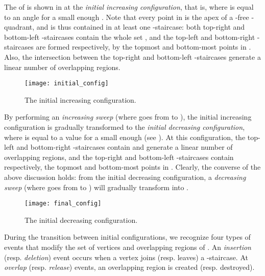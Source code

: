 \documentclass[11pt,letterpaper,english]{article}
\theoremstyle{definition}
\begin{document}
The  of  is shown in  at the
\emph{initial increasing configuration}, that is, where  is
equal to an angle  for a small enough
. Note that every point in  is the apex of a -free
-quadrant, and is thus contained in at least one
-staircase: both top-right and bottom-left -staircases
contain the whole set , and the top-left and bottom-right
-staircases are formed respectively, by the topmost and
bottom-most points in . Also, the intersection between the
top-right and bottom-left -staircases generate a linear number
of overlapping regions.

\begin{figure}[ht]
  \centering
  \begin{minipage}{0.9\textwidth}
    \centering
    \texttt{[image: initial\_config]}
    \caption{The initial increasing configuration.}
    \label{bhull:fig:initial_config}
  \end{minipage}
\end{figure}

By performing an \emph{increasing sweep} (where  goes from 
to ), the initial increasing configuration is gradually
transformed to the \emph{initial decreasing configuration}, where
 is equal to a value  for a small
enough  (see ). At this
configuration, the top-left and bottom-right -staircases
contain  and generate a linear number of overlapping regions, and
the top-right and bottom-left -staircases contain respectively,
the topmost and bottom-most points in . Clearly, the converse of
the above discussion holds: from the initial decreasing configuration,
a \emph{decreasing sweep} (where  goes from  to ) will
gradually transform  into .

\begin{figure}[ht]
  \centering
  \begin{minipage}{0.9\textwidth}
    \centering
    \texttt{[image: final\_config]}
    \caption{The initial decreasing configuration.}
    \label{bhull:fig:final_config}
  \end{minipage}
\end{figure}

During the transition between initial configurations, we recognize
four types of events that modify the set of vertices and overlapping
regions of . An \emph{insertion} (resp. \emph{deletion})
event occurs when a vertex joins (resp. leaves) a
-staircase. At \emph{overlap} (resp. \emph{release}) events, an
overlapping region is created (resp. destroyed).
\end{document}
